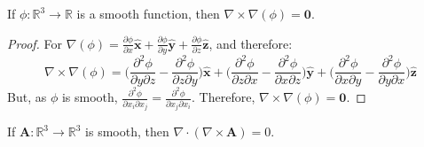             \begin{theorem}
            If $\phi:\mathbb{R}^{3}\rightarrow \mathbb{R}$ is a smooth function, then $\nabla \times \nabla(\phi) = \boldsymbol{0}$.
            \end{theorem}
            \begin{proof}
            For $\nabla(\phi) = \frac{\partial \phi}{\partial x}\hat{\mathbf{x}}+\frac{\partial \phi}{\partial y}\hat{\mathbf{y}}+\frac{\partial \phi}{\partial z}\hat{\mathbf{z}}$, and therefore:
            \begin{equation*}
                \nabla \times \nabla(\phi) = \bigg(\frac{\partial^{2} \phi}{\partial y \partial z} - \frac{\partial^{2}\phi}{\partial z \partial y}\bigg)\hat{\mathbf{x}}+\bigg(\frac{\partial^{2} \phi}{\partial z \partial x} - \frac{\partial^{2}\phi}{\partial x \partial z}\bigg)\hat{\mathbf{y}}+\bigg(\frac{\partial^{2} \phi}{\partial x \partial y} - \frac{\partial^{2}\phi}{\partial y \partial x}\bigg)\hat{\mathbf{z}}
            \end{equation*}
            But, as $\phi$ is smooth, $\frac{\partial^{2}\phi}{\partial x_{i}\partial x_{j}} = \frac{\partial^{2}\phi}{\partial x_{j}\partial x_{i}}$. Therefore, $\nabla \times \nabla(\phi) = \boldsymbol{0}$.
            \end{proof}
            \begin{theorem}
            If $\mathbf{A}:\mathbb{R}^{3}\rightarrow \mathbb{R}^{3}$ is smooth, then $\nabla\cdot(\nabla \times \mathbf{A}) = 0$.
            \end{theorem}
